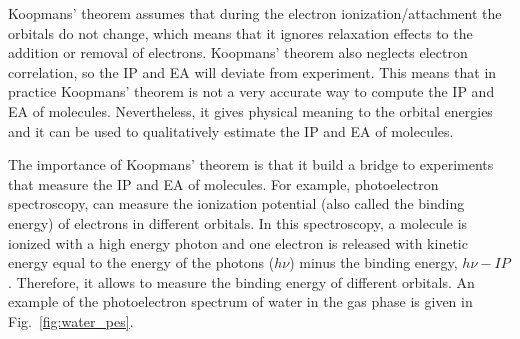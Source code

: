 \documentclass[../Main/chem371-notes.tex]{subfiles}
\begin{document}
Koopmans' theorem assumes that during the electron ionization/attachment the orbitals do not change, which means that it ignores relaxation effects to the addition or removal of electrons.
Koopmans' theorem also neglects electron correlation, so the IP and EA will deviate from experiment.
This means that in practice Koopmans' theorem is not a very accurate way to compute the IP and EA of molecules.
Nevertheless, it gives physical meaning to the orbital energies and it can be used to qualitatively estimate the IP and EA of molecules.


The importance of Koopmans' theorem is that it build a bridge to experiments that measure the IP and EA of molecules.
For example, photoelectron spectroscopy, can measure the ionization potential (also called the binding energy) of electrons in different orbitals.
In this spectroscopy, a molecule is ionized with a high energy photon and one electron is released with kinetic energy equal to the energy of the photons ($h \nu$) minus the binding energy, $h \nu - IP$.
Therefore, it allows to measure the binding energy of different orbitals.
An example of the photoelectron spectrum of water in the gas phase is given in Fig.~\ref{fig:water_pes}.
\end{document}
